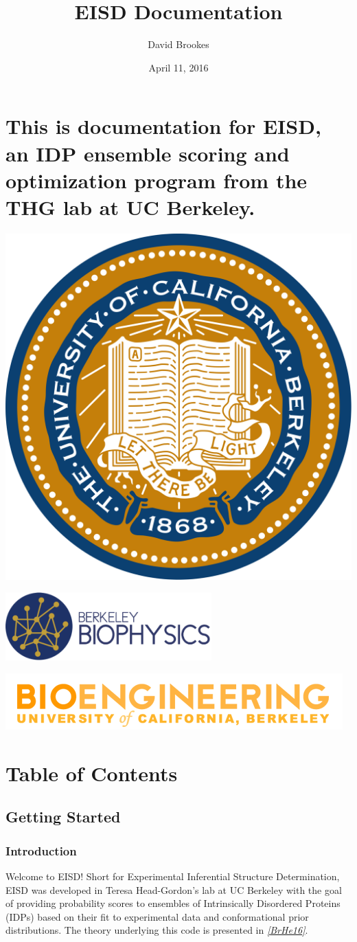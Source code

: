 \documentclass[letterpaper,10pt,english]{sphinxmanual}
\title{EISD Documentation}
\date{April 11, 2016}
\author{David Brookes}
\begin{document}
\maketitle
\tableofcontents
{}\label{index::doc}



\chapter{This is documentation for EISD, an IDP ensemble scoring and optimization program from the THG lab at UC Berkeley.}
\label{index:welcome}\label{index:this-is-documentation-for-eisd-an-idp-ensemble-scoring-and-optimization-program-from-the-thg-lab-at-uc-berkeley}
\includegraphics[width=0.300\linewidth]{seal.png}

\includegraphics[width=0.300\linewidth]{biophysics_logo.png}

\includegraphics[width=0.300\linewidth]{header3.png}


\chapter{Table of Contents}
\label{index:table-of-contents}

\section{Getting Started}
\label{intro:getting-started}\label{intro::doc}

\subsection{Introduction}
\label{intro:introduction}
Welcome to EISD! Short for Experimental Inferential Structure
Determination, EISD was developed in Teresa Head-Gordon's lab at
UC Berkeley with the goal of providing probability scores to ensembles of
Intrinsically Disordered Proteins (IDPs) based on their fit to experimental
data and conformational prior distributions. The theory underlying this
code is presented in \label{intro:id1}{\hyperref[references:brhe16]{\emph{{[}BrHe16{]}}}}.
\end{document}
